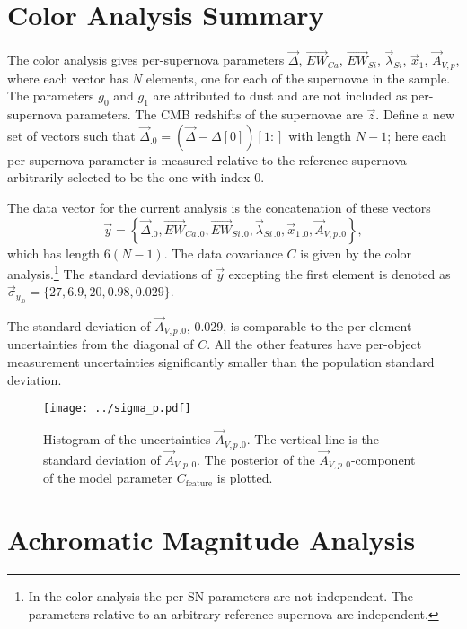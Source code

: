 \documentclass{aastex61}   	%
\begin{document}
\section{Color Analysis Summary}
\label{color:sec}
The color analysis gives per-supernova parameters
$\vec{\Delta}$,  $\overrightarrow{EW}_{Ca}$,  $\overrightarrow{EW}_{Si}$,  $\vec{\lambda}_{Si}$,   $\vec{x}_1$,  $\vec{A}_{V,p}$,
where each vector has $N$ elements, one for each of the supernovae in the sample.  The parameters $g_0$ and $g_1$ are attributed to dust
and are not included as per-supernova parameters.  The CMB redshifts of the supernovae are $\vec{z}$.  Define a new set of vectors such that
$\vec{\Delta}_{.0} = (\vec{\Delta} - \Delta[0])[1:]$ with length $N-1$; here each per-supernova parameter is measured relative to the
reference supernova arbitrarily selected to be the one with index 0.

The data vector for the current analysis is the concatenation of these vectors
\[
\vec{y} = \left\{\vec{\Delta}_{.0} , \overrightarrow{EW}_{Ca\,.0} ,  \overrightarrow{EW}_{Si\,.0},  \vec{\lambda}_{Si\,.0},   \vec{x}_{1\,.0}, \vec{A}_{V,p\,.0}\right\},
\]
which has length $6(N-1)$.  The data covariance $C$ is given by the color analysis.\footnote{In
the color analysis the per-SN parameters
are not independent.  The parameters relative to an arbitrary reference supernova are independent.}
The standard deviations of $\vec{y}$ excepting the first element is denoted as $\vec{\sigma}_{y_{.0}}=\{27,  6.9,  20,   0.98,   0.029\}$.

The  standard deviation of $\vec{A}_{V,p\,.0}$, 0.029,  is comparable to the per element uncertainties from the diagonal of $C$.
All the other features have per-object measurement uncertainties significantly smaller than the population standard deviation.

\begin{figure}[htbp] %
   \centering
   \texttt{[image: ../sigma\_p.pdf]}
   \caption{
Histogram of the uncertainties $\vec{A}_{V,p\,.0}$.  The vertical line is the standard deviation of $\vec{A}_{V,p\,.0}$.
The posterior of the $\vec{A}_{V,p\,.0}$-component of the model parameter $C_{\text{feature}}$ is plotted.
   \label{sigma_p:fig}}
\end{figure}


\section{Achromatic Magnitude Analysis}
\label{magnitude:sec}
\end{document}
